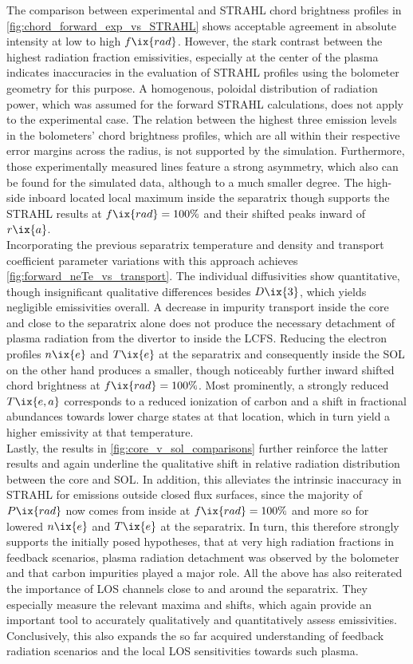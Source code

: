 %
            \newline%
            The comparison between experimental and STRAHL chord brightness profiles in \cref{fig:chord_forward_exp_vs_STRAHL} shows acceptable agreement in absolute intensity at low to high $f\ix{rad}$. However, the stark contrast between the highest radiation fraction emissivities, especially at the center of the plasma indicates inaccuracies in the evaluation of STRAHL profiles using the bolometer geometry for this purpose. A homogenous, poloidal distribution of radiation power, which was assumed for the forward STRAHL calculations, does not apply to the experimental case. The relation between the highest three emission levels in the bolometers' chord brightness profiles, which are all within their respective error margins across the radius, is not supported by the simulation. Furthermore, those experimentally measured lines feature a strong asymmetry, which also can be found for the simulated data, although to a much smaller degree. The high-side inboard located local maximum inside the separatrix though supports the STRAHL results at $f\ix{rad}=100\%$ and their shifted peaks inward of $r\ix{a}$.\\%
            Incorporating the previous separatrix temperature and density and transport coefficient parameter variations with this approach achieves \cref{fig:forward_neTe_vs_transport}. The individual diffusivities show quantitative, though insignificant qualitative differences besides $D\ix{3}$, which yields negligible emissivities overall. A decrease in impurity transport inside the core and close to the separatrix alone does not produce the necessary detachment of plasma radiation from the divertor to inside the LCFS. Reducing the electron profiles $n\ix{e}$ and $T\ix{e}$ at the separatrix and consequently inside the SOL on the other hand produces a smaller, though noticeably further inward shifted chord brightness at $f\ix{rad}=100\%$. Most prominently, a strongly reduced $T\ix{e,a}$ corresponds to a reduced ionization of carbon and a shift in fractional abundances towards lower charge states at that location, which in turn yield a higher emissivity at that temperature.\\%
            Lastly, the results in \cref{fig:core_v_sol_comparisons} further reinforce the latter results and again underline the qualitative shift in relative radiation distribution between the core and SOL. In addition, this alleviates the intrinsic inaccuracy in STRAHL for emissions outside closed flux surfaces, since the majority of $P\ix{rad}$ now comes from inside at $f\ix{rad}=100\%$ and more so for lowered $n\ix{e}$ and $T\ix{e}$ at the separatrix. In turn, this therefore strongly supports the initially posed hypotheses, that at very high radiation fractions in feedback scenarios, plasma radiation detachment was observed by the bolometer and that carbon impurities played a major role. All the above has also reiterated the importance of LOS channels close to and around the separatrix. They especially measure the relevant maxima and shifts, which again provide an important tool to accurately qualitatively and quantitatively assess emissivities. Conclusively, this also expands the so far acquired understanding of feedback radiation scenarios and the local LOS sensitivities towards such plasma.%
%
